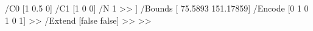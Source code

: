 {{							/C0 [1 0.5 0] /C1 [1 0 0] /N 1 
						>>
					]
					/Bounds [ 75.5893 151.17859] 
					/Encode [0 1  0 1 0 1] 
				>> 
				/Extend [false false] 
			>> 
			\fi
			\fi
	>>}%
	\xdef\pgfplots@glob@TMPa{%
		/pgfpatPlotsurface\pgfplotslibrarysurf@count\space \the\pdflastobj\space 0 R
	}%
	\pgfplotsutil@advancestringcounter@global\pgfplotslibrarysurf@count
}

%
%

